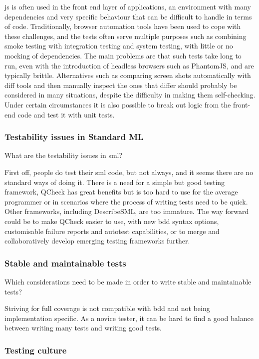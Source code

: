 \documentclass[11pt]{article}
\begin{document}
\Gls{js} is often used in the front end layer of applications, an environment with many dependencies and very specific behaviour that can be difficult to handle in terms of code. Traditionally, browser automation tools have been used to cope with these challenges, and the tests often serve multiple purposes such as combining smoke testing with integration testing and system testing, with little or no mocking of dependencies. The main problems are that such tests take long to run, even with the introduction of headless browsers such as PhantomJS, and are typically brittle. Alternatives such as comparing screen shots automatically with diff tools and then manually inspect the ones that differ should probably be considered in many situations, despite the difficulty in making them self-checking. Under certain circumstances it is also possible to break out logic from the front-end code and test it with unit tests.

\subsubsection{Testability issues in Standard ML}
\label{subsubsec:whynotsml}

What are the testability issues in \gls{sml}?

First off, people do test their \gls{sml} code, but not always, and it seems there are no standard ways of doing it. There is a need for a simple but good testing framework, QCheck has great benefits but is too hard to use for the average programmer or in scenarios where the process of writing tests need to be quick. Other frameworks, including DescribeSML, are too immature. The way forward could be to make QCheck easier to use, with new \gls{bdd} syntax options, customisable failure reports and autotest capabilities, or to merge and collaboratively develop emerging testing frameworks further.

\subsubsection{Stable and maintainable tests}

Which considerations need to be made in order to write stable and maintainable tests?

Striving for full coverage is not compatible with \gls{bdd} and not being implementation specific. As a novice tester, it can be hard to find a good balance between writing many tests and writing good tests.

\subsubsection{Testing culture}
\end{document}
